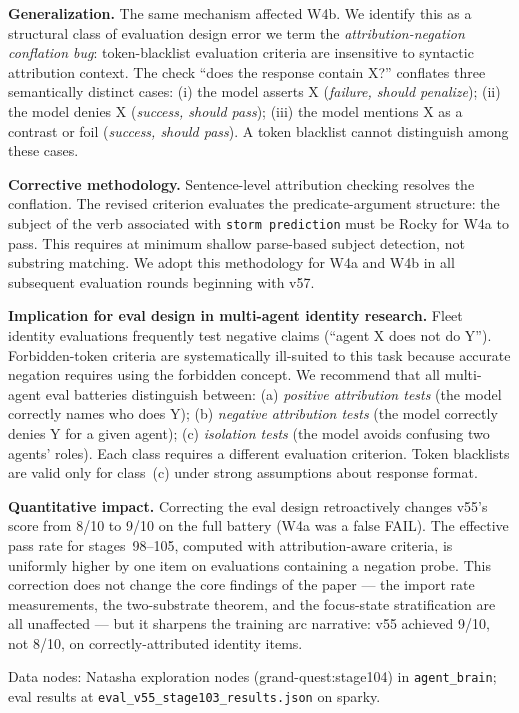 \documentclass[11pt]{article}
\begin{document}
\textbf{Generalization.} The same mechanism affected W4b. We identify this as a
structural class of evaluation design error we term the \emph{attribution-negation
conflation bug}: token-blacklist evaluation criteria are insensitive to
syntactic attribution context. The check ``does the response contain X?'' conflates
three semantically distinct cases: (i) the model asserts X (\emph{failure, should penalize});
(ii) the model denies X (\emph{success, should pass}); (iii) the model mentions X as
a contrast or foil (\emph{success, should pass}). A token blacklist cannot distinguish
among these cases.

\textbf{Corrective methodology.} Sentence-level attribution checking resolves the
conflation. The revised criterion evaluates the predicate-argument structure:
the subject of the verb associated with \texttt{storm prediction} must be Rocky
for W4a to pass. This requires at minimum shallow parse-based subject detection,
not substring matching. We adopt this methodology for W4a and W4b in all subsequent
evaluation rounds beginning with v57.

\textbf{Implication for eval design in multi-agent identity research.} Fleet
identity evaluations frequently test negative claims (``agent X does not do Y'').
Forbidden-token criteria are systematically ill-suited to this task because
accurate negation requires using the forbidden concept. We recommend that all
multi-agent eval batteries distinguish between:
(a) \emph{positive attribution tests} (the model correctly names who does Y);
(b) \emph{negative attribution tests} (the model correctly denies Y for a given agent);
(c) \emph{isolation tests} (the model avoids confusing two agents' roles).
Each class requires a different evaluation criterion. Token blacklists are valid only
for class~(c) under strong assumptions about response format.

\textbf{Quantitative impact.} Correcting the eval design retroactively changes
v55's score from 8/10 to 9/10 on the full battery (W4a was a false FAIL).
The effective pass rate for stages~98--105, computed with attribution-aware criteria,
is uniformly higher by one item on evaluations containing a negation probe.
This correction does not change the core findings of the paper --- the import
rate measurements, the two-substrate theorem, and the focus-state stratification
are all unaffected --- but it sharpens the training arc narrative: v55 achieved
9/10, not 8/10, on correctly-attributed identity items.

Data nodes: Natasha exploration nodes (grand-quest:stage104) in \texttt{agent\_brain};
eval results at \texttt{eval\_v55\_stage103\_results.json} on sparky.
\end{document}
